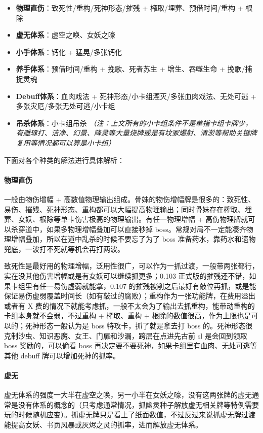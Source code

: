 ﻿\documentclass[12pt, a4paper]{article}
\begin{document}
\begin{itemize}
    \item \textbf{物理直伤}：致死性/重构/死神形态/摧残 + 榨取/埋葬、预借时间/重构 + 根除
    \item \textbf{虚无体系}：虚空之唤、女妖之嚎
    \item \textbf{小手体系}：钙化 + 猛晃/多张钙化
    \item \textbf{养手体系}：预借时间/重构 + 挽歌、死者苏生 + 增生、吞噬生命 + 挽歌/捕捉灵魂
    \item \textbf{Debuff体系}：血肉戏法 + 死神形态/小卡组湮灭/多张血肉戏法、无处可逃 + 多张灾厄/多张无处可逃/小卡组
    \item \textbf{吊杀体系}：小卡组吊杀
    \textit{（注：上文所有的小卡组条件不是单指卡组卡牌少，有雕琢打、洁净、幻景、降灵等大量烧牌或是有坟冢爆射、清淤等帮助关键牌复用等情况都可以算是小卡组）}
\end{itemize}

下面对各个种类的解法进行具体解析：

\paragraph{物理直伤}
一般由物伤增幅 + 高数值物理输出组成。骨妹的物伤增幅牌是很多的：致死性、易伤、摧残、死神形态、重构都可以大幅提高物理输出；同时骨妹存在榨取、埋葬、女妖、根除等单卡伤害极高的物理输出。有任一物理增幅 + 高伤物理牌就可以杀穿道中，如果多物理增幅叠加可以直接秒掉 boss。常规对局不一定能凑齐物理增幅叠加，所以在道中乱杀的时候不要忘了为了 boss 准备药水，靠药水和遗物兜底，一波打不死就等机会再打两波。

致死性是最好用的物理增幅，泛用性很广，可以作为一抓过渡，一般带两张都行，实在没其他伤害增幅或是有女妖可以继续抓更多；0.103 正式版的摧残还不错，如果卡组里有任一易伤虚弱就能拿，0.107 的摧残被削之后最好有敲位再抓，或是能保证易伤虚弱覆盖时间长（如有敲过的腐败）；重构作为一张功能牌，在费用溢出或者有 X 费的情况下就能考虑抓，一般不太会为了输出去抓重构，能带动重构的卡组本身就不会弱，不过重构 + 榨取、重构 + 根除的数值很高，作为上限也是可以的；死神形态一般认为是 boss 特攻卡，抓了就是拿去打 boss 的。死神形态很克制沙虫、知识恶魔、女王、门扉和沙漏，跨层在点进先古前 sl 是会回到领取 boss 奖励的，可以偷看 boss 再决定要不要死神，如果卡组里有血肉、无处可逃等其他 debuff 牌可以增加死神的抓率。

\paragraph{虚无}
虚无体系的强度一大半在虚空之唤，另一小半在女妖之嚎，没有这两张牌的虚无通常是没有体系的概念的（只考虑通常情况，抓幽灵种子解放虚无相关牌等特例需要玩的时候随机应变）。抓虚无牌只是看上了纸面数值，不过反过来说抓虚无牌过渡能提高女妖、书页风暴或灰烬之灵的抓率，进而解放虚无体系。
\end{document}
